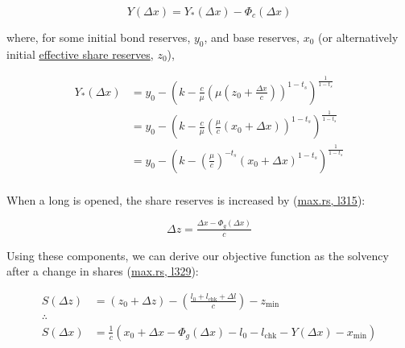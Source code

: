 \begin{equation}\label{long-amount}
Y(\Delta x) = Y_{*}(\Delta x) - \Phi_{c}(\Delta x)
\end{equation}

where, for some initial bond reserves, $y_{0}$, and base reserves, $x_{0}$ (or alternatively initial \href{https://github.com/delvtech/hyperdrive/blob/34b562e8952cf9cf235e551484790bbc7ff65884/contracts/src/libraries/HyperdriveMath.sol#L147}{effective share reserves}, $z_{0}$),

\begin{equation}
\begin{aligned}
Y_{*}(\Delta x) &= y_{0} - \left( k - \tfrac{c}{\mu} \left( \mu \left( z_{0} + \tfrac{\Delta x}{c} \right) \right)^{1 - t_{s}} \right)^{\tfrac{1}{1 - t_{s}}} \\
&= y_{0} - \left( k - \tfrac{c}{\mu} \left( \tfrac{\mu}{c} \left( x_{0} + \Delta x \right) \right)^{1 - t_{s}} \right)^{\tfrac{1}{1 - t_{s}}} \\
&= y_{0} - \left( k - \left( \tfrac{\mu}{c} \right)^{- t_{s}} \left( x_{0} + \Delta x \right)^{1 - t_{s}} \right)^{\tfrac{1}{1 - t_{s}}} \\
\end{aligned}
\end{equation}

When a long is opened, the share reserves is increased by (\href{https://github.com/delvtech/hyperdrive/blob/f410574fffcb8b2556208c158494ba2972525843/crates/hyperdrive-math/src/long/max.rs#L315}{max.rs, l315}):

\begin{equation}\label{dz}
\Delta z = \tfrac{\Delta x - \Phi_{g}(\Delta x)}{c}
\end{equation}

Using these components, we can derive our objective function as the solvency after a change in shares (\href{https://github.com/delvtech/hyperdrive/blob/f410574fffcb8b2556208c158494ba2972525843/crates/hyperdrive-math/src/long/max.rs#L329}{max.rs, l329}):

\begin{equation}
\begin{aligned}
S(\Delta z) &= \left( z_{0} + \Delta z \right) - \left( \tfrac{l_{0} + l_{\text{chk}} + \Delta l}{c} \right) - z_{\text{min}} \\
\therefore \\
S(\Delta x) &= \tfrac{1}{c} \left( x_{0} + \Delta x - \Phi_{g}\left( \Delta x \right) - l_{0} - l_{\text{chk}} - Y(\Delta x) - x_{\text{min}} \right) \\
\end{aligned}
\end{equation}

